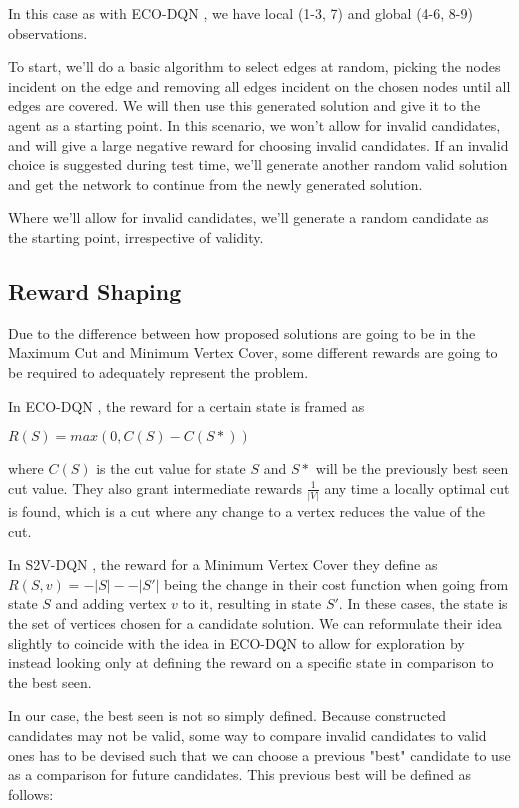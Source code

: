 \documentclass{article}
\begin{document}
In this case as with ECO-DQN \cite{eco-dqn}, we have local (1-3, 7) and global (4-6, 8-9) observations.

To start, we'll do a basic algorithm to select edges at random, picking the nodes incident on the edge and removing all edges incident on the chosen nodes until all edges are covered. We will then use this generated solution and give it to the agent as a starting point. In this scenario, we won't allow for invalid candidates, and will give a large negative reward for choosing invalid candidates. If an invalid choice is suggested during test time, we'll generate another random valid solution and get the network to continue from the newly generated solution. 

Where we'll allow for invalid candidates, we'll generate a random candidate as the starting point, irrespective of validity.

\subsection{Reward Shaping}

Due to the difference between how proposed solutions are going to be in the Maximum Cut and Minimum Vertex Cover, some different rewards are going to be required to adequately represent the problem.

In ECO-DQN \cite{eco-dqn}, the reward for a certain state is framed as

$R(S) = max(0, C(S) - C(S*))$

where $C(S)$ is the cut value for state $S$ and $S*$ will be the previously best seen cut value. They also grant intermediate rewards $\frac{1}{|V|}$ any time a locally optimal cut is found, which is a cut where any change to a vertex reduces the value of the cut.

In S2V-DQN \cite{s2v-dqn}, the reward for a Minimum Vertex Cover they define as $R(S, v) = -|S| - -|S'|$ being the change in their cost function when going from state $S$ and adding vertex $v$ to it, resulting in state $S'$. In these cases, the state is the set of vertices chosen for a candidate solution. We can reformulate their idea slightly to coincide with the idea in ECO-DQN to allow for exploration by instead looking only at defining the reward on a specific state in comparison to the best seen.

In our case, the best seen is not so simply defined. Because constructed candidates may not be valid, some way to compare invalid candidates to valid ones has to be devised such that we can choose a previous "best" candidate to use as a comparison for future candidates. This previous best will be defined as follows:
\end{document}
